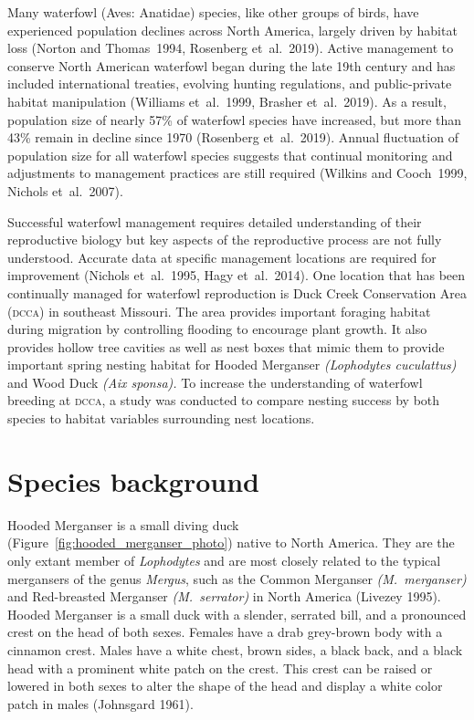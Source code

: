 
Many waterfowl (Aves: Anatidae) species, like other groups of birds, have experienced population declines across North America, largely driven by habitat loss (Norton and Thomas~1994, Rosenberg et~al.~2019).  Active management to conserve North American waterfowl began during the late 19th century and has included international treaties, evolving hunting regulations, and public-private habitat manipulation (Williams et~al.~1999, Brasher et~al.~2019). As a result, population size of nearly 57\% of waterfowl species have increased, but more than 43\% remain in decline since 1970 (Rosenberg et~al.~2019). Annual fluctuation of population size for all waterfowl species suggests that continual monitoring and adjustments to management practices are still required  (Wilkins and Cooch~1999, Nichols et~al.~2007). 

	Successful waterfowl management requires detailed understanding of their reproductive biology but key aspects of the reproductive process are not fully understood. Accurate data at specific management locations are required for improvement (Nichols et~al.~1995, Hagy et~al.~2014). One location that has been continually managed for waterfowl reproduction is Duck Creek Conservation Area \textsc{(dcca)} in southeast Missouri. The area provides important foraging habitat during migration by controlling flooding to encourage plant growth. It also provides hollow tree cavities as well as nest boxes that mimic them to provide important spring nesting habitat for Hooded Merganser \textit{(Lophodytes cuculattus)} and Wood Duck \textit{(Aix sponsa).} To increase the understanding of waterfowl breeding at \textsc{dcca}, a study was conducted to compare nesting success by both species to habitat variables surrounding nest locations.  




\section*{Species background}

Hooded Merganser is a small diving duck (Figure~\ref{fig:hooded_merganser_photo}) native to North America. They are the only extant member of \textit{Lophodytes} and are most closely related to the typical mergansers of the genus \textit{Mergus}, such as the Common Merganser \textit{(M.~merganser)} and Red-breasted Merganser \textit{(M.~serrator)} in North America (Livezey 1995). Hooded Merganser is a small duck with a slender, serrated bill, and a pronounced crest on the head of both sexes. Females have a drab grey-brown body with a cinnamon crest. Males have a white chest, brown sides, a black back, and a black head with a prominent white patch on the crest. This crest can be raised or lowered in both sexes to alter the shape of the head and display a white color patch in males (Johnsgard 1961). 

